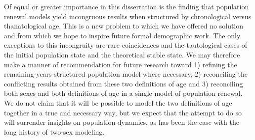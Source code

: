 Of equal or greater importance in this dissertation is the finding that
population renewal models yield incongruous results when structured by
chronological versus thanatological age. This is a new problem to 
which we have offered no solution and from which we hope to inspire future
formal demographic work. The only exceptions to this incongruity are rare
coincidences and the tautological cases of the initial population state and 
the theoretical stable state. We may therefore make a manner of recommendation for
future research toward 1) refining the remaining-years-structured population
model where necessary, 2) reconciling the conflicting results obtained from
these two definitions of age and 3) reconciling both sexes and both
definitions of age in a single model of population renewal. We do not claim that
it will be possible to model the two definitions of age together in a true and
necessary way, but we expect that the attempt to do so will surrender insights
on population dynamics, as has been the case with the long history of two-sex
modeling.


